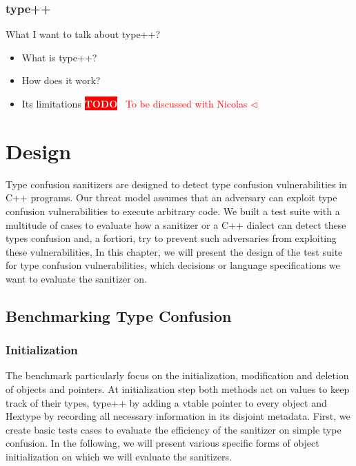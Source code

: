 \documentclass[a4paper,11pt,oneside]{report}
\newcommand{\todobox}[3]{%
       \colorbox{#1}{\textcolor{white}{\sffamily\bfseries\scriptsize #2}}%
       ~\textcolor{#1}{#3} %
       \textcolor{#1}{$\triangleleft$}%
}
\newcommand{\adrbqt}[1]{\todobox{red}{TODO}{#1}}
\begin{document}
\subsection{type++}

What I want to talk about type++?
\begin{itemize}
       \item What is type++?
       \item How does it work?
       \item Its limitations \adrbqt{To be discussed with Nicolas}
\end{itemize}


\chapter{Design}

Type confusion sanitizers are designed to detect type confusion vulnerabilities in C++ programs. 
Our threat model assumes that an adversary can exploit type confusion vulnerabilities to execute arbitrary code. 
We built a test suite with a multitude of cases to evaluate how a sanitizer or a C++ dialect can detect these types confusion and, 
a fortiori, try to prevent such adversaries from exploiting these vulnerabilities,
In this chapter, we will present the design of the test suite for type confusion vulnerabilities, which decisions or 
language specifications we want to evaluate the sanitizer on.

\section{Benchmarking Type Confusion}

\subsection{Initialization}

The benchmark particularly focus on the initialization, modification and deletion of objects and pointers. At initialization step 
both methods act on values to keep track of their types, type++ by adding a vtable pointer to every object and Hextype by 
recording all necessary information in its disjoint metadata. 
First, we create basic tests cases to evaluate the efficiency of the sanitizer 
on simple type confusion. In the following, we will present various specific forms of object initialization on which 
we will evaluate the sanitizers.
\end{document}
